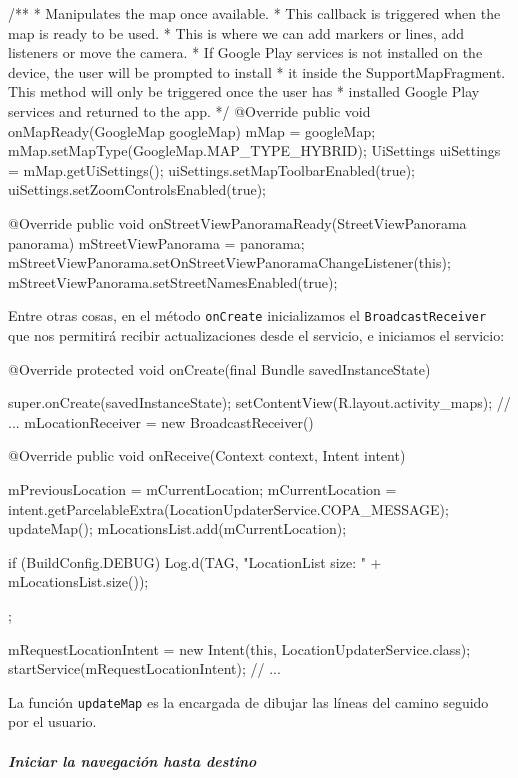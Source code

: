 \documentclass[	DIV=calc,%
							paper=a4,%
							fontsize=11pt]{scrartcl}	 					%
\begin{document}
\begin{javacode}
	/**
	 * Manipulates the map once available.
	 * This callback is triggered when the map is ready to be used.
	 * This is where we can add markers or lines, add listeners or move the camera.
	 * If Google Play services is not installed on the device, the user will be prompted to install
	 * it inside the SupportMapFragment. This method will only be triggered once the user has
	 * installed Google Play services and returned to the app.
	 */
	@Override
	public void onMapReady(GoogleMap googleMap) {
			mMap = googleMap;
			mMap.setMapType(GoogleMap.MAP_TYPE_HYBRID);
			UiSettings uiSettings = mMap.getUiSettings();
			uiSettings.setMapToolbarEnabled(true);
			uiSettings.setZoomControlsEnabled(true);
	}

	@Override
	public void onStreetViewPanoramaReady(StreetViewPanorama panorama) {
			mStreetViewPanorama = panorama;
			mStreetViewPanorama.setOnStreetViewPanoramaChangeListener(this);
			mStreetViewPanorama.setStreetNamesEnabled(true);
	}
\end{javacode}

Entre otras cosas, en el método \texttt{onCreate} inicializamos el
\texttt{BroadcastReceiver} que nos permitirá recibir actualizaciones
desde el servicio, e iniciamos el servicio:

\begin{javacode}
	@Override
	protected void onCreate(final Bundle savedInstanceState) {
			super.onCreate(savedInstanceState);
			setContentView(R.layout.activity_maps);
	//  ...
			mLocationReceiver = new BroadcastReceiver() {
					@Override
					public void onReceive(Context context, Intent intent) {
							mPreviousLocation = mCurrentLocation;
							mCurrentLocation = intent.getParcelableExtra(LocationUpdaterService.COPA_MESSAGE);
							updateMap();
							mLocationsList.add(mCurrentLocation);

							if (BuildConfig.DEBUG) {
									Log.d(TAG, "LocationList size: " + mLocationsList.size());
							}
					}
			};

			mRequestLocationIntent = new Intent(this, LocationUpdaterService.class);
			startService(mRequestLocationIntent);
	// ...
	}
\end{javacode}

La función \texttt{updateMap} es la encargada de dibujar las líneas del
camino seguido por el usuario.

\subparagraph{Iniciar la navegación hasta
destino}\label{iniciar-la-navegaciuxf3n-hasta-destino}
\end{document}
